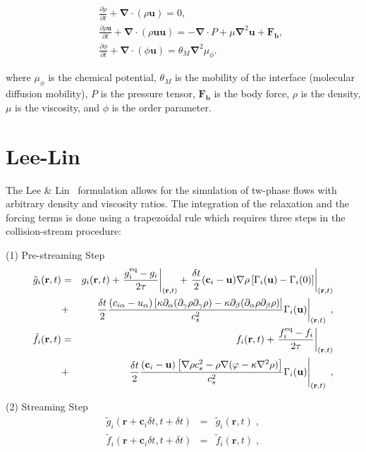 \documentclass[12pt]{report}
\newcommand{\vect}[1]{\ensuremath{\mathrm{\mathbf{#1}}}}
\newcommand{\pdiv}[2]{\ensuremath{\frac{\partial #1}{\partial #2}}}
\begin{document}
\begin{eqnarray}
  &&\pdiv{\rho}{t} + \vect{\nabla}\cdot(\rho\vect{u}) = 0,\label{eqn:mass_conservation}\\
  &&\pdiv{\rho\vect{u}}{t} + \vect{\nabla}\cdot(\rho\vect{u}\vect{u}) = -\vect{\nabla}\cdot P +
       \mu\vect{\nabla}^{2}\vect{u}+\vect{F_{b}},\label{eqn:Navier-Stokes} \\
  &&\pdiv{\phi}{t} + \vect{\nabla}\cdot(\phi\vect{u}) = \theta_{M}\vect{\nabla}^{2}\mu_{\phi}.\label{eqn:Cahn-Hilliard}
\end{eqnarray}

where $\mu_\phi$ is the chemical potential, $\theta_{M}$ is the mobility of the interface (molecular diffusion mobility), $P$ is the pressure tensor, $\vect{F_{b}}$ is the body force, $\rho$ is the density, $\mu$ is the viscosity, and $\phi$ is the order parameter.

\section{Lee-Lin}
The Lee \& Lin~\cite{Lee2005} formulation allows for the simulation of tw-phase flows with arbitrary density and viscosity ratios. The integration of the relaxation and the forcing terms is done using a trapezoidal rule which requires three steps in the collision-stream procedure:

{(1) \sc Pre-streaming Step}
\begin{eqnarray}
\tilde{g}_i(\vect{r}, t) & = & g_i(\vect{r},t) + \left.\frac{g_i^{\rm eq}-g_i}{2\tau}\right|_{(\vect{r},t)}
+ \left.\frac{\delta t}{2}(\vect{c}_i - \vect{u})\nabla\rho\left[ \Gamma_i(\vect{u}) - \Gamma_i(0) \right]\right|_{(\vect{r},t)}\nonumber\\
& + & \left.\frac{\delta t}{2}\frac{(c_{i\alpha}-u_\alpha)\left[ \kappa\partial_\alpha(\partial_\gamma\rho\partial_\gamma\rho) -
\kappa\partial_\beta(\partial_\alpha\rho\partial_\beta\rho) \right]}{c_s^2}\Gamma_i(\vect{u})\right|_{(\vect{r},t)}\;,\label{eq:LeePreStreamG}\\
\tilde{f}_i(\vect{r}, t) & = & f_i(\vect{r},t) + \left.\frac{f_i^{\rm eq}-f_i}{2\tau}\right|_{(\vect{r},t)}\nonumber\\
& + & \left.\frac{\delta t}{2}\frac{(\vect{c}_i-\vect{u})\left[ \nabla\rho c_s^2-\rho\nabla(\varphi-\kappa\nabla^2\rho) \right]}{c_s^2}\Gamma_i(\vect{u})\right|_{(\vect{r},t)}\;,\label{eq:LeePreStreamF}
\end{eqnarray}

{(2) \sc Streaming Step}
\begin{eqnarray}
\tilde{g}_i(\vect{r}+\vect{c}_i\delta t,t + \delta t) & = & \tilde{g}_i(\vect{r},t)\;,\label{eq:LeeStreamG}\\
\tilde{f}_i(\vect{r}+\vect{c}_i\delta t,t + \delta t) & = & \tilde{f}_i(\vect{r},t)\;,\label{eq:LeeStreamF}
\end{eqnarray}
\end{document}
